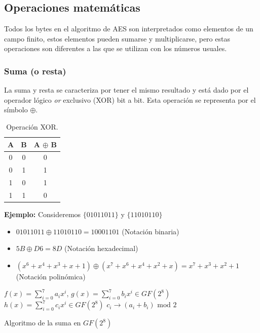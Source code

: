\documentclass[peerreview]{IEEEtran}
\begin{document}
\subsection{Operaciones matemáticas}
Todos los bytes en el algoritmo de AES son interpretados como elementos de un campo finito, estos elementos pueden sumarse y multiplicarse, pero estas operaciones son diferentes a las que se utilizan con los números usuales.
\bigbreak

\subsubsection{Suma (o resta)}
La suma y resta se caracteriza por tener el mismo resultado y está dado por el operador lógico \textit{or} exclusivo (XOR) bit a bit. Esta operación se representa por el símbolo $\oplus$.

\begin{table}[h]
\centering
\begin{tabular}{|c|c|c|}
\hline
A & B & A $\oplus$ B \\ \hline
0 & 0 & 0         \\ \hline
0 & 1 & 1         \\ \hline
1 & 0 & 1         \\ \hline
1 & 1 & 0         \\ \hline
\end{tabular}
\caption{\label{tab:XOR}Operación XOR.}
\end{table}
\textbf{Ejemplo:}
Consideremos $\{0101 1011\}$ y $\{1101 0110\}$
\begin{itemize}
    \item $01011011 \oplus 11010110=10001101$ (Notación binaria)
    
    \item $5B\oplus D6=8D$ (Notación hexadecimal)
    
    \item $(x^6 +x^4 +x^3 +x+1)\oplus (x^7 + x^6 + x^4 + x^2 +x)=x^7 + x^3 + x^2 +1$ (Notación polinómica)
\end{itemize}

\begin{algorithm}
\begin{algorithmic}[1]
  \REQUIRE $f(x)=\sum_{i=0}^{7}a_{i}x^{i}$, $g(x)=\sum_{i=0}^{7}b_{i}x^{i} \in GF(2^8)$
  \ENSURE  $h(x)=\sum_{i=0}^{7}c_{i}x^i \in GF(2^8)$
  \STATE $c_i  \to (a_i + b_i) \text{ mod } 2$
  \ENDFOR
\end{algorithmic} 
  
  \caption{Algoritmo de la suma en $GF(2^8)$}
  \label{a1}
\end{algorithm}
\end{document}
